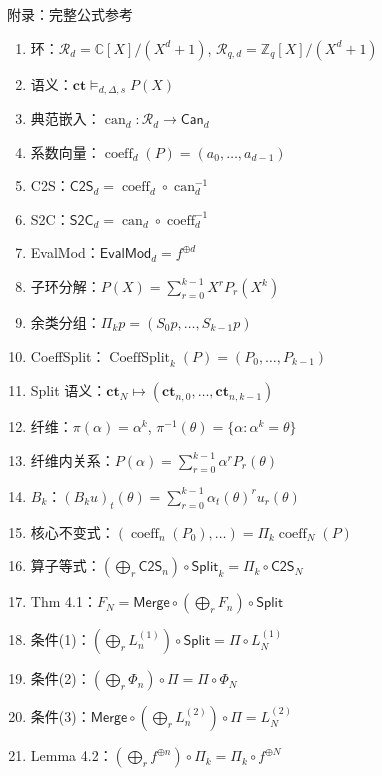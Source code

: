 \documentclass[aspectratio=169, 10pt, xcolor=svgnames, table, UTF8]{ctexbeamer}
\newcommand{\vDashsym}{\mathrel{\vDash}}
\newcommand{\can}{\operatorname{can}}
\newcommand{\coeffvec}{\operatorname{coeff}}
\newcommand{\cots}{\mathsf{C2S}}
\newcommand{\stoc}{\mathsf{S2C}}
\newcommand{\evalmod}{\mathsf{EvalMod}}
\newcommand{\splitop}{\mathsf{Split}}
\newcommand{\mergeop}{\mathsf{Merge}}
\newcommand{\ringR}{\mathcal{R}}
\newcommand{\ringZ}{\mathbb{Z}}
\newcommand{\ringC}{\mathbb{C}}
\newcommand{\canSpace}{\mathsf{Can}}
\begin{document}
\appendix
\begin{frame}[allowframebreaks]{附录：完整公式参考}
  \small
  \begin{enumerate}
    \item 环：\(\ringR_d = \ringC[X]/(X^d+1)\), \(\ringR_{q,d} = \ringZ_q[X]/(X^d+1)\)
    \item 语义：\(\mathbf{ct} \vDashsym_{d,\Delta,s} P(X)\)
    \item 典范嵌入：\(\can_d : \ringR_d \to \canSpace_d\)
    \item 系数向量：\(\coeffvec_d(P) = (a_0,\ldots,a_{d-1})\)
    \item C2S：\(\cots_d = \coeffvec_d \circ \can_d^{-1}\)
    \item S2C：\(\stoc_d = \can_d \circ \coeffvec_d^{-1}\)
    \item EvalMod：\(\evalmod_d = f^{\oplus d}\)
    \item 子环分解：\(P(X) = \sum_{r=0}^{k-1} X^r P_r(X^k)\)
    \item 余类分组：\(\Pi_k p = (S_0 p, \ldots, S_{k-1} p)\)
    \item CoeﬀSplit：\(\operatorname{CoeffSplit}_k(P) = (P_0,\ldots,P_{k-1})\)
    \item Split 语义：\(\mathbf{ct}_N \mapsto (\mathbf{ct}_{n,0},\ldots,\mathbf{ct}_{n,k-1})\)
    \item 纤维：\(\pi(\alpha) = \alpha^k\), \(\pi^{-1}(\theta) = \{\alpha : \alpha^k = \theta\}\)
    \item 纤维内关系：\(P(\alpha) = \sum_{r=0}^{k-1} \alpha^r P_r(\theta)\)
    \item \(B_k\)：\((B_k u)_t(\theta) = \sum_{r=0}^{k-1} \alpha_t(\theta)^r u_r(\theta)\)
    \item 核心不变式：\((\coeffvec_n(P_0),\ldots) = \Pi_k \coeffvec_N(P)\)
    \item 算子等式：\((\bigoplus_r \cots_n) \circ \splitop_k = \Pi_k \circ \cots_N\)
    \item Thm 4.1：\(F_N = \mergeop \circ (\bigoplus_r F_n) \circ \splitop\)
    \item 条件(1)：\((\bigoplus_r L_n^{(1)}) \circ \splitop = \Pi \circ L_N^{(1)}\)
    \item 条件(2)：\((\bigoplus_r \Phi_n) \circ \Pi = \Pi \circ \Phi_N\)
    \item 条件(3)：\(\mergeop \circ (\bigoplus_r L_n^{(2)}) \circ \Pi = L_N^{(2)}\)
    \item Lemma 4.2：\((\bigoplus_r f^{\oplus n}) \circ \Pi_k = \Pi_k \circ f^{\oplus N}\)

\end{enumerate}
\end{frame}
\end{document}

